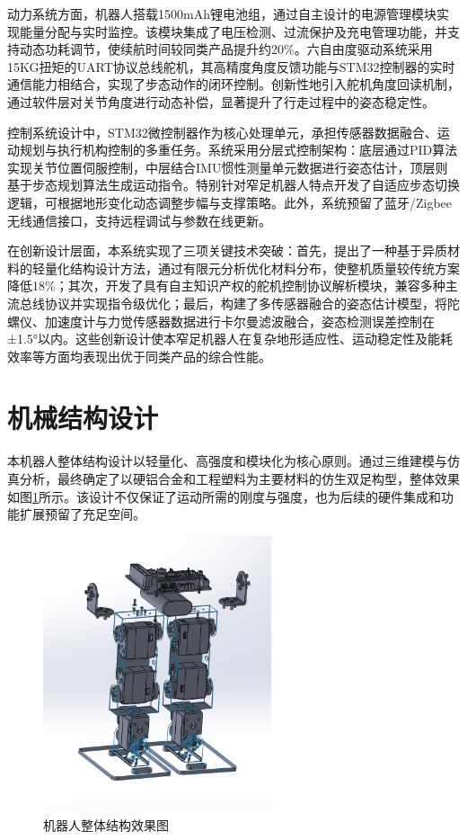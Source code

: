 \documentclass[a4paper,fontset=windows]{ctexart}
\begin{document}
动力系统方面，机器人搭载1500mAh锂电池组，通过自主设计的电源管理模块实现能量分配与实时监控。该模块集成了电压检测、过流保护及充电管理功能，并支持动态功耗调节，使续航时间较同类产品提升约20\%。六自由度驱动系统采用15KG扭矩的UART协议总线舵机，其高精度角度反馈功能与STM32控制器的实时通信能力相结合，实现了步态动作的闭环控制。创新性地引入舵机角度回读机制，通过软件层对关节角度进行动态补偿，显著提升了行走过程中的姿态稳定性。

控制系统设计中，STM32微控制器作为核心处理单元，承担传感器数据融合、运动规划与执行机构控制的多重任务。系统采用分层式控制架构：底层通过PID算法实现关节位置伺服控制，中层结合IMU惯性测量单元数据进行姿态估计，顶层则基于步态规划算法生成运动指令。特别针对窄足机器人特点开发了自适应步态切换逻辑，可根据地形变化动态调整步幅与支撑策略。此外，系统预留了蓝牙/Zigbee无线通信接口，支持远程调试与参数在线更新。

在创新设计层面，本系统实现了三项关键技术突破：首先，提出了一种基于异质材料的轻量化结构设计方法，通过有限元分析优化材料分布，使整机质量较传统方案降低18\%；其次，开发了具有自主知识产权的舵机控制协议解析模块，兼容多种主流总线协议并实现指令级优化；最后，构建了多传感器融合的姿态估计模型，将陀螺仪、加速度计与力觉传感器数据进行卡尔曼滤波融合，姿态检测误差控制在±1.5°以内。这些创新设计使本窄足机器人在复杂地形适应性、运动稳定性及能耗效率等方面均表现出优于同类产品的综合性能。

\section{机械结构设计}
本机器人整体结构设计以轻量化、高强度和模块化为核心原则。通过三维建模与仿真分析，最终确定了以硬铝合金和工程塑料为主要材料的仿生双足构型，整体效果如图\ref{fig:overall}所示。该设计不仅保证了运动所需的刚度与强度，也为后续的硬件集成和功能扩展预留了充足空间。

\begin{figure}[H]
    \centering
    \includegraphics[width=0.6\textwidth]{整体效果图.png}
    \caption{机器人整体结构效果图}
    \label{fig:overall}
\end{figure}
\end{document}
